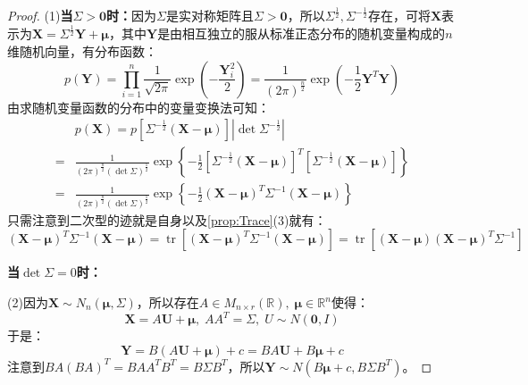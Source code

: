 \begin{proof}
	(1)\textbf{当$\Sigma>\mathbf{0}$时：}因为$\Sigma$是实对称矩阵且$\Sigma>\mathbf{0}$，所以$\Sigma^{\frac{1}{2}},\Sigma^{-\frac{1}{2}}$存在，可将$\mathbf{X}$表示为$\mathbf{X}=\Sigma^{\frac{1}{2}}\mathbf{Y}+\boldsymbol{\mu}$，其中$\mathbf{Y}$是由相互独立的服从标准正态分布的随机变量构成的$n$维随机向量，有分布函数：
	\begin{equation*}
		p(\mathbf{Y})=\prod_{i=1}^{n}\frac{1}{\sqrt{2\pi}}\exp\left(-\frac{\mathbf{Y}_i^2}{2}\right)=\frac{1}{(2\pi)^{\frac{n}{2}}}\exp\left(-\frac{1}{2}\mathbf{Y}^T\mathbf{Y}\right)
	\end{equation*}
	由求随机变量函数的分布中的变量变换法可知：
	\begin{align*}
		&p(\mathbf{X})=p[\Sigma^{-\frac{1}{2}}(\mathbf{X}-\boldsymbol{\mu})]|\det\Sigma^{-\frac{1}{2}}| \\
		=&\frac{1}{(2\pi)^{\frac{n}{2}}(\det\Sigma)^\frac{1}{2}}\exp\left\{-\frac{1}{2}[\Sigma^{-\frac{1}{2}}(\mathbf{X}-\boldsymbol{\mu})]^T[\Sigma^{-\frac{1}{2}}(\mathbf{X}-\boldsymbol{\mu})]\right\} \\
		=&\frac{1}{(2\pi)^{\frac{n}{2}}(\det\Sigma)^{\frac{1}{2}}}\exp\left\{-\frac{1}{2}(\mathbf{X}-\boldsymbol{\mu})^T\Sigma^{-1}(\mathbf{X}-\boldsymbol{\mu})\right\}
	\end{align*}
	只需注意到二次型的迹就是自身以及\cref{prop:Trace}(3)就有：
	\begin{equation*}
		(\mathbf{X}-\boldsymbol{\mu})^T\Sigma^{-1}(\mathbf{X}-\boldsymbol{\mu})=\operatorname{tr}[(\mathbf{X}-\boldsymbol{\mu})^T\Sigma^{-1}(\mathbf{X}-\boldsymbol{\mu})]=\operatorname{tr}[(\mathbf{X}-\boldsymbol{\mu})(\mathbf{X}-\boldsymbol{\mu})^T\Sigma^{-1}]
	\end{equation*}\par
	\textbf{当$\det\Sigma=0$时：}\par
	(2)因为$\mathbf{X}\sim N_n(\boldsymbol{\mu},\Sigma)$，所以存在$A\in M_{n\times r}(\mathbb{R}),\;\boldsymbol{\mu}\in\mathbb{R}^{n}$使得：
	\begin{equation*}
		\mathbf{X}=A\mathbf{U}+\boldsymbol{\mu},\;AA^T=\Sigma,\;U\sim N(\mathbf{0},I)
	\end{equation*}
	于是：
	\begin{equation*}
		\mathbf{Y}=B(A\mathbf{U}+\boldsymbol{\mu})+c=BA\mathbf{U}+B\boldsymbol{\mu}+c
	\end{equation*}
	注意到$BA(BA)^T=BAA^TB^T=B\Sigma B^T$，所以$\mathbf{Y}\sim N(B\boldsymbol{\mu}+c,B\Sigma B^T)$。\par

\end{proof}
